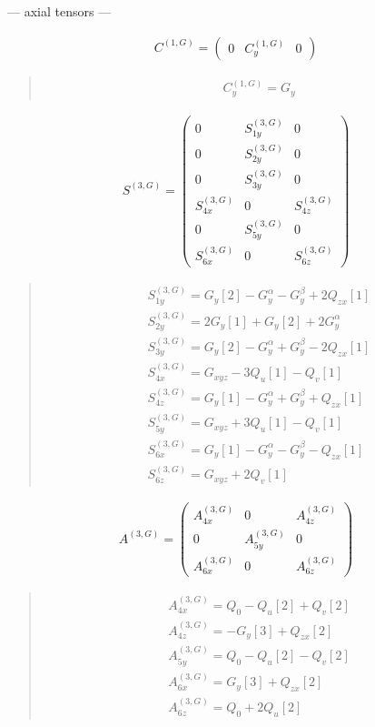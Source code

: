 \documentclass[fleqn,10pt]{jsarticle}
\begin{document}
\newpage
\begin{center}\LARGE --- axial tensors ---\end{center}
\begin{align*}
C^{(1,G)} = \begin{pmatrix} 0 & C^{(1,G)}_{y} & 0 \end{pmatrix}
\end{align*}
\begin{quote}
\begin{align*}
& C^{(1,G)}_{y} = G_{y}
\end{align*}
\end{quote}
\begin{align*}
S^{(3,G)} = \begin{pmatrix} 0 & S^{(3,G)}_{1y} & 0 \\ 0 & S^{(3,G)}_{2y} & 0 \\ 0 & S^{(3,G)}_{3y} & 0 \\ S^{(3,G)}_{4x} & 0 & S^{(3,G)}_{4z} \\ 0 & S^{(3,G)}_{5y} & 0 \\ S^{(3,G)}_{6x} & 0 & S^{(3,G)}_{6z} \end{pmatrix}
\end{align*}
\begin{quote}
\begin{align*}
& S^{(3,G)}_{1y} = G_{y}[2] - G_{y}^{\alpha} - G_{y}^{\beta} + 2 Q_{zx}[1] \\
& S^{(3,G)}_{2y} = 2 G_{y}[1] + G_{y}[2] + 2 G_{y}^{\alpha} \\
& S^{(3,G)}_{3y} = G_{y}[2] - G_{y}^{\alpha} + G_{y}^{\beta} - 2 Q_{zx}[1] \\
& S^{(3,G)}_{4x} = G_{xyz} - 3 Q_{u}[1] - Q_{v}[1] \\
& S^{(3,G)}_{4z} = G_{y}[1] - G_{y}^{\alpha} + G_{y}^{\beta} + Q_{zx}[1] \\
& S^{(3,G)}_{5y} = G_{xyz} + 3 Q_{u}[1] - Q_{v}[1] \\
& S^{(3,G)}_{6x} = G_{y}[1] - G_{y}^{\alpha} - G_{y}^{\beta} - Q_{zx}[1] \\
& S^{(3,G)}_{6z} = G_{xyz} + 2 Q_{v}[1]
\end{align*}
\end{quote}
\begin{align*}
A^{(3,G)} = \begin{pmatrix} A^{(3,G)}_{4x} & 0 & A^{(3,G)}_{4z} \\ 0 & A^{(3,G)}_{5y} & 0 \\ A^{(3,G)}_{6x} & 0 & A^{(3,G)}_{6z} \end{pmatrix}
\end{align*}
\begin{quote}
\begin{align*}
& A^{(3,G)}_{4x} = Q_{0} - Q_{u}[2] + Q_{v}[2] \\
& A^{(3,G)}_{4z} = - G_{y}[3] + Q_{zx}[2] \\
& A^{(3,G)}_{5y} = Q_{0} - Q_{u}[2] - Q_{v}[2] \\
& A^{(3,G)}_{6x} = G_{y}[3] + Q_{zx}[2] \\
& A^{(3,G)}_{6z} = Q_{0} + 2 Q_{u}[2]
\end{align*}
\end{quote}
\end{document}
